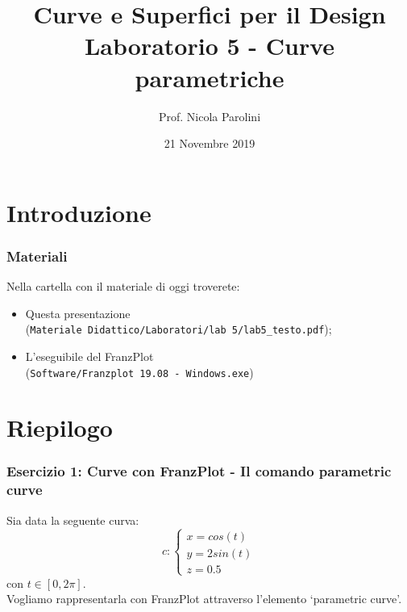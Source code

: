 \documentclass{beamer}
\title[Curve e Sup. - Lab 5]{Curve e Superfici per il Design \\ Laboratorio 5 - Curve parametriche}
\author[Prof.ssa Scotti]{Prof. Nicola Parolini}
\date{21 Novembre 2019}
\newcommand{\frnzplt}{FranzPlot }
\begin{document}
\begin{frame}
\maketitle
\end{frame}
\section{Introduzione}
\begin{frame}
\frametitle{Materiali}
Nella cartella con il materiale di oggi troverete:
\begin{itemize}
\item Questa presentazione \\ (\texttt{Materiale Didattico/Laboratori/lab 5/lab5\_testo.pdf});
\item L'eseguibile del \frnzplt \\ (\texttt{Software/Franzplot 19.08 - Windows.exe})
\end{itemize}
\end{frame}

\section{Riepilogo}
%
\begin{frame}
\frametitle{Esercizio 1: Curve con \frnzplt - Il comando parametric curve}
Sia data la seguente curva:
\begin{displaymath}
c:
\begin{cases}
    x = cos(t)\\
    y = 2 sin(t)\\
    z = 0.5
\end{cases}
\end{displaymath}
    con $t \in [0, 2\pi]$. \\
Vogliamo rappresentarla con \frnzplt attraverso l'elemento `parametric curve'.
\end{frame}
%
\end{document}
